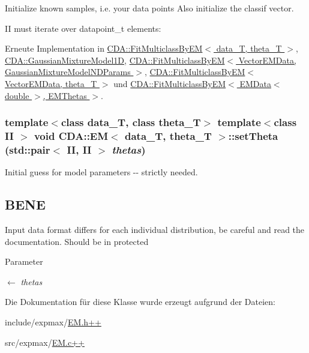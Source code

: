 Initialize known samples, i.e. your data points Also initialize the classif vector. 



II must iterate over datapoint\_\-t elements: 



Erneute Implementation in \hyperlink{classCDA_1_1FitMulticlassByEM_a7247bfcad3c828f9cf372b6c414e93f0}{CDA::FitMulticlassByEM$<$ data\_\-T, theta\_\-T $>$}, \hyperlink{classCDA_1_1GaussianMixtureModel1D_ada5a646f31d12697bc0fc66934a54dab}{CDA::GaussianMixtureModel1D}, \hyperlink{classCDA_1_1FitMulticlassByEM_a7247bfcad3c828f9cf372b6c414e93f0}{CDA::FitMulticlassByEM$<$ VectorEMData, GaussianMixtureModelNDParams $>$}, \hyperlink{classCDA_1_1FitMulticlassByEM_a7247bfcad3c828f9cf372b6c414e93f0}{CDA::FitMulticlassByEM$<$ VectorEMData, theta\_\-T $>$} und \hyperlink{classCDA_1_1FitMulticlassByEM_a7247bfcad3c828f9cf372b6c414e93f0}{CDA::FitMulticlassByEM$<$ EMData$<$ double $>$, EMThetas $>$}.

\hypertarget{classCDA_1_1EM_ae71052b178877852d34c3aa17e85f8ef}{
\subsubsection[{setTheta}]{\setlength{\rightskip}{0pt plus 5cm}template$<$class data\_\-T, class theta\_\-T$>$ template$<$class II $>$ void {\bf CDA::EM}$<$ data\_\-T, theta\_\-T $>$::setTheta (std::pair$<$ II, II $>$ {\em thetas})}}
\label{classCDA_1_1EM_ae71052b178877852d34c3aa17e85f8ef}


Initial guess for model parameters -\/-\/ strictly needed. 

\hypertarget{classCDA_1_1GaussianMixtureModelNDParams_NOTA}{}\subsection{BENE}\label{classCDA_1_1GaussianMixtureModelNDParams_NOTA}
Input data format differs for each individual distribution, be careful and read the documentation. Should be in protected


\begin{DoxyParams}{Parameter}
\item[\mbox{$\leftarrow$} {\em thetas}]\end{DoxyParams}


Die Dokumentation für diese Klasse wurde erzeugt aufgrund der Dateien:\begin{DoxyCompactItemize}
\item 
include/expmax/\hyperlink{EM_8h_09_09}{EM.h++}\item 
src/expmax/\hyperlink{EM_8c_09_09}{EM.c++}\end{DoxyCompactItemize}
